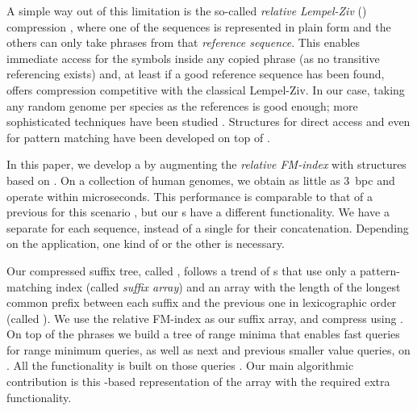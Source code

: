 A simple way out of this limitation is the so-called \emph{relative Lempel-Ziv}
(\RLZ) compression \cite{Kuruppu2010}, where one of the sequences is represented
in plain form and the others can only take phrases from that \emph{reference
sequence}. This enables immediate access for the symbols inside any copied
phrase (as no transitive referencing exists) and, at least if a good reference
sequence has been found, offers compression competitive with the
classical Lempel-Ziv. In our case, taking any random genome per species as the
references is good enough; more sophisticated techniques have been studied
\cite{KPZ11}. Structures for direct access \cite{DG11,Ferrada2014}
and even for pattern matching \cite{DJSS14,Belazzougui2014} have been developed
on top of \RLZ.

In this paper, we develop a \CST{} by augmenting the \emph{relative FM-index}
\cite{Belazzougui2014} with structures based on \RLZ.
On a collection of human genomes, we obtain as little as 3~bpc and operate
within microseconds. This performance is comparable to that of a previous \CST{}
for this scenario \cite{Navarro2014}, but our \CST{}s have a different
functionality. We have a separate \CST{} for each sequence, instead of a single
\CST{} for their concatenation. Depending on the application, one kind of \CST{} or
the other is necessary.

Our compressed suffix tree, called \RCST, follows a trend of \CST{}s
\cite{Fischer2009a,Ohlebusch2009,Ohlebusch2010,Gog2011a,Abeliuk2013} that use only a pattern-matching index
(called \emph{suffix array}) and an array with the length of the longest common prefix
between each suffix and the previous one in lexicographic order (called \LCP).
We use the relative FM-index as our suffix array, and
compress \LCP{} using \RLZ. On top of the \RLZ{} phrases we build a tree
of range minima that enables fast queries for range minimum queries, as well as
next and previous smaller value queries, on \LCP{} \cite{Abeliuk2013}. All the \CST{} functionality
is built on those queries \cite{Fischer2009a}. Our main algorithmic contribution
is this \RLZ\nobreakdash-based representation of the \LCP{} array with the required extra
functionality.
